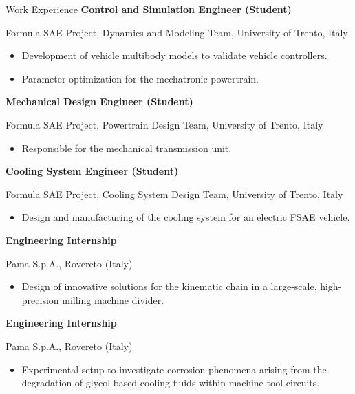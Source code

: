 \begin{rubric}{Work Experience}
\entry*[09/2018 -- 06/2019]%
	\textbf{Control and Simulation Engineer (Student)} 
    \par Formula SAE Project, Dynamics and Modeling Team, University of Trento, Italy
    \vspace{-0.3cm}
    \begin{itemize}
        \item Development of vehicle multibody models to validate vehicle controllers. \vspace{-0.35cm}
        \item Parameter optimization for the mechatronic powertrain.
    \end{itemize}
%
\entry*[09/2017 -- 07/2018]%
	\textbf{Mechanical Design Engineer (Student)} 
    \par Formula SAE Project, Powertrain Design Team, University of Trento, Italy
    \vspace{-0.3cm}
    \begin{itemize}
        \item Responsible for the mechanical transmission unit.
    \end{itemize}
%
\entry*[06/2016 -- 08/2017]%
	\textbf{Cooling System Engineer (Student)} 
    \par Formula SAE Project, Cooling System Design Team, University of Trento, Italy
    \vspace{-0.3cm}
    \begin{itemize}
        \item Design and manufacturing of the cooling system for an electric FSAE vehicle.
    \end{itemize}
%
\entry*[08/2018 -- 09/2018]%
	\textbf{Engineering Internship} 
    \par Pama S.p.A., Rovereto (Italy)
    \vspace{-0.3cm}
    \begin{itemize}
        \item Design of innovative solutions for the kinematic chain in a large-scale, high-precision milling machine divider.
    \end{itemize}
%
\entry*[09/2016]%
    \textbf{Engineering Internship} 
    \par Pama S.p.A., Rovereto (Italy)
    \vspace{-0.3cm}
    \begin{itemize}
        \item Experimental setup to investigate corrosion phenomena arising from the degradation of glycol-based cooling fluids within machine tool circuits.

\end{itemize}
\end{rubric}
